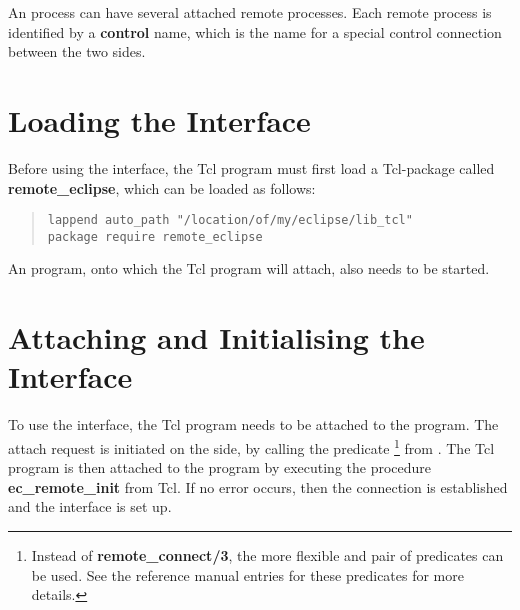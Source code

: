 An {\eclipse} process can have several attached remote processes. Each
remote process is identified by a {\bf control} name, which is the
{\eclipse} name for a special control connection between the two sides. 

\section{Loading the Interface}
{\sloppy
Before using the interface, 
the Tcl program must first load a Tcl-package called {\bf
remote_eclipse}, which can be loaded as follows:

\begin{quote}\begin{verbatim}
lappend auto_path "/location/of/my/eclipse/lib_tcl"
package require remote_eclipse
\end{verbatim}\end{quote}
% 

An {\eclipse} program, onto which the Tcl program will attach, also needs to
be started.
}

\section{Attaching and Initialising the Interface}

To use the interface, the Tcl program needs to be
attached to the {\eclipse} program. The attach request is initiated on the
{\eclipse} side, by calling the predicate
 \footnote{Instead of {\bf remote_connect/3}, the more
flexible  and 
pair of predicates can be used. See the reference manual entries for these predicates for more
details.} from {\eclipse}. The Tcl program is then attached to the
{\eclipse} program by executing the procedure {\bf
ec_remote_init} from Tcl. If no error
occurs, then the connection is established and the interface is set up.


